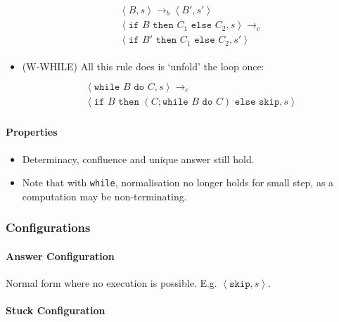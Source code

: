 \documentclass[twocolumn,english]{article}
\begin{document}
\begin{itemize}
\begin{multline*}
\begin{array}{c}
\left\langle B,s\right\rangle \rightarrow_{b}\left\langle B',s'\right\rangle \\
\hline \left\langle \texttt{if }B\texttt{ then }C_{1}\texttt{ else }C_{2},s\right\rangle \rightarrow_{c}\\
\left\langle \texttt{if }B'\texttt{ then }C_{1}\texttt{ else }C_{2},s'\right\rangle 
\end{array}
\end{multline*}
\item {\scriptsize{}(W-WHILE)} All this rule does is `unfold' the loop once:
\begin{multline*}
\begin{array}{c}
\\
\hline \left\langle \texttt{while }B\texttt{ do }C,s\right\rangle \rightarrow_{c}\\
\left\langle \texttt{if }B\texttt{ then }(C;\texttt{while }B\texttt{ do }C)\texttt{ else skip},s\right\rangle 
\end{array}
\end{multline*}
\end{itemize}

\paragraph{Properties}
\begin{itemize}
\item Determinacy, confluence and unique answer still hold.
\item Note that with \texttt{while}, normalisation no longer holds for small
step, as a computation may be non-terminating.
\end{itemize}

\subsubsection{Configurations}

\paragraph{Answer Configuration}

Normal form where no execution is possible. E.g. $\left\langle \texttt{skip},s\right\rangle $.

\paragraph{Stuck Configuration}
\end{document}
